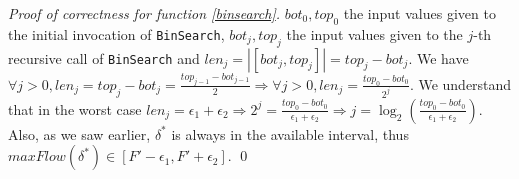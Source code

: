 \documentclass[11pt]{llncs}
\begin{document}
\begin{proof}[Proof of correctness for function \ref{binsearch}]
       $bot_0, top_0$ the input values given to the initial invocation of \texttt{BinSearch}, $bot_j,top_j$ the input
       values given to the $j$-th recursive call of \texttt{BinSearch} and $len_j =|[bot_j, top_j]| = top_j - bot_j$. We have
       $\forall j > 0, len_j = top_j - bot_j = \frac{top_{j-1} - bot_{j-1}}{2} \Rightarrow \forall j >0, len_j =
       \frac{top_0 - bot_0}{2^j}$. We understand that in the worst case $len_j = \epsilon_1 + \epsilon_2 \Rightarrow
       2^j = \frac{top_0-bot_0}{\epsilon_1 + \epsilon_2} \Rightarrow j = \log_2(\frac{top_0-bot_0}{\epsilon_1+\epsilon_2})$.
       Also, as we saw earlier, $\delta^*$ is always in the available interval, thus $maxFlow(\delta^*) \in [F' - \epsilon_1,
       F' + \epsilon_2]$. \qed
    \end{proof}
\end{document}
